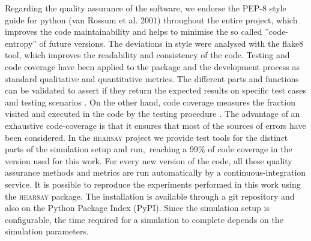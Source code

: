\documentclass[crop]{CSLB}
\newcommand{\hs}{\textsc{hearsay}}
\begin{document}
%
Regarding the quality assurance of the software, we endorse the PEP-8
style guide for python (van Rossum et al. 2001) throughout the entire
project, which improves the code maintainability and helps to minimise
the so called ''code-entropy'' of future versions.
%
The deviations in style were analysed with the flake8 tool, which
improves the readability and consistency of the code.
%
Testing and code coverage have been applied to the package and the
development process as standard qualitative and quantitative metrics.
%
The different parts and functions can be validated to assert if they
return the expected results on specific test cases and testing
scenarios \citep{jazayeri_engeneering_2007}.
%
On the other hand, code coverage measures the fraction visited and
executed in the code by the testing procedure
\citep{miller_testing_1963}.
%
The advantage of an exhaustive code-coverage is that it ensures that
most of the sources of errors have been considered.
%
In the \hs{} project we provide test tools for the distinct parts of
the simulation setup and run, reaching a 99\% of code coverage in the
version used for this work.
%
For every new version of the code, all these quality assurance methods
and metrics are run automatically by a continuous-integration service.
%
It is possible to reproduce the experiments performed in this work
using the \hs{} package.
%
The installation is available through a git repository and also on the
Python Package Index (PyPI).
%
Since the simulation setup is configurable, the time required for a
simulation to complete depends on the simulation parameters.
















\end{document}
